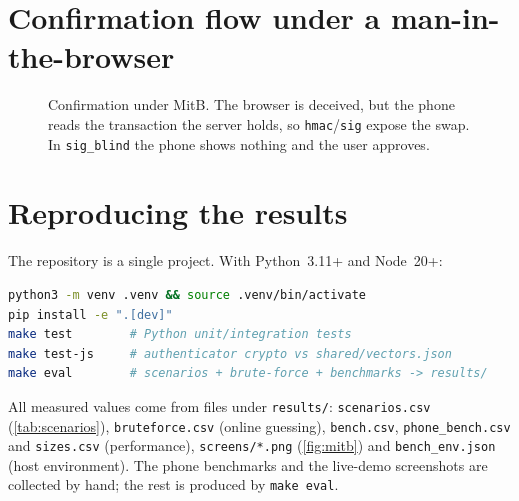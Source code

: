 \section{Confirmation flow under a man-in-the-browser}\label{app:confirm}
\begin{figure}[H]
\centering
{}
\caption{Confirmation under MitB. The browser is deceived, but the phone
reads the transaction the server holds, so \texttt{hmac}/\texttt{sig} expose the
swap. In \texttt{sig\_blind} the phone shows nothing and the user approves.}
\label{fig:confirm}
\end{figure}

\section{Reproducing the results}\label{app:repro}
The repository is a single project. With Python~3.11+ and Node~20+:
\begin{lstlisting}[language=bash]
python3 -m venv .venv && source .venv/bin/activate
pip install -e ".[dev]"
make test        # Python unit/integration tests
make test-js     # authenticator crypto vs shared/vectors.json
make eval        # scenarios + brute-force + benchmarks -> results/
\end{lstlisting}
All measured values come from files under \texttt{results/}:
\texttt{scenarios.csv} (\cref{tab:scenarios}), \texttt{bruteforce.csv} (online
guessing), \texttt{bench.csv}, \texttt{phone\_bench.csv} and \texttt{sizes.csv}
(performance), \texttt{screens/*.png} (\cref{fig:mitb}) and
\texttt{bench\_env.json} (host environment). The phone benchmarks and the
live-demo screenshots are collected by hand; the rest is produced by
\texttt{make eval}.

